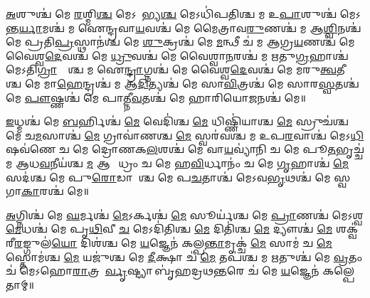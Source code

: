 
\ul{𑌅}\ul{}𑌶𑍁𑌶𑍍𑌚॑ 𑌮𑍇 \ul{𑌰}𑌶𑍍𑌮𑌿\ul{𑌶𑍍𑌚} 𑌮𑍇𑌽𑌦𑌾᳚𑌭𑍍𑌯\ul{𑌶𑍍𑌚} 𑌮𑍇𑌽𑌧𑌿॑𑌪𑌤𑌿𑌶𑍍𑌚 𑌮 𑌉\ul{𑌪𑌾}\ul{}𑌶𑍁𑌶𑍍𑌚॑ 𑌮𑍇𑌽𑌨𑍍𑌤\ul{𑌰𑍍𑌯𑌾}𑌮𑌶𑍍𑌚॑ 𑌮 𑌐𑌨𑍍𑌦𑍍𑌰𑌵𑌾\ul{𑌯}𑌵𑌶𑍍𑌚॑ 𑌮𑍇 𑌮𑍈𑌤𑍍𑌰𑌾𑌵\ul{𑌰𑍁}𑌣𑌶𑍍𑌚॑ 𑌮 𑌆\ul{𑌶𑍍𑌵𑌿}𑌨𑌶𑍍𑌚॑ 𑌮𑍇 𑌪𑍍𑌰𑌤𑌿\ul{𑌪𑍍𑌰}𑌸𑍍𑌥𑌾𑌨॑𑌶𑍍𑌚 𑌮𑍇 \ul{𑌶𑍁}𑌕𑍍𑌰𑌶𑍍𑌚॑ 𑌮𑍇 \ul{𑌮}𑌨𑍍𑌥𑍀 𑌚॑ 𑌮 𑌆𑌗𑍍𑌰\ul{𑌯}𑌣𑌶𑍍𑌚॑ 𑌮𑍇 𑌵𑍈𑌶𑍍𑌵\ul{𑌦𑍇}𑌵𑌶𑍍𑌚॑ 𑌮𑍇 \ul{𑌧𑍍𑌰𑍁}𑌵𑌶𑍍𑌚॑ 𑌮𑍇 𑌵𑍈𑌶𑍍𑌵𑌾\ul{𑌨}𑌰𑌶𑍍𑌚॑ 𑌮 𑌋𑌤𑍁\ul{𑌗𑍍𑌰}𑌹𑌾𑌶𑍍𑌚॑ 𑌮𑍇𑌽𑌤𑌿\ul{𑌗𑍍𑌰𑌾}𑌹𑍍𑌯𑌾᳚𑌶𑍍𑌚 𑌮 𑌐\ul{𑌨𑍍𑌦𑍍𑌰𑌾}𑌗𑍍𑌨𑌶𑍍𑌚॑ 𑌮𑍇 𑌵𑍈𑌶𑍍𑌵\ul{𑌦𑍇}𑌵𑌶𑍍𑌚॑ 𑌮𑍇 𑌮𑌰𑍁\ul{𑌤𑍍𑌵}𑌤𑍀𑌯𑌾᳚𑌶𑍍𑌚 𑌮𑍇 𑌮𑌾\ul{𑌹𑍇}𑌨𑍍𑌦𑍍𑌰𑌶𑍍𑌚॑ 𑌮 𑌆\ul{𑌦𑌿}𑌤𑍍𑌯𑌶𑍍𑌚॑ 𑌮𑍇 𑌸𑌾\ul{𑌵𑌿}𑌤𑍍𑌰𑌶𑍍𑌚॑ 𑌮𑍇 𑌸𑌾𑌰\ul{𑌸𑍍𑌵}𑌤𑌶𑍍𑌚॑ 𑌮𑍇 \ul{𑌪𑍗}𑌷𑍍𑌣𑌶𑍍𑌚॑ 𑌮𑍇 𑌪𑌾𑌤𑍍𑌨𑍀\ul{𑌵}𑌤𑌶𑍍𑌚॑ 𑌮𑍇 𑌹𑌾𑌰𑌿𑌯𑍋\ul{𑌜}𑌨𑌶𑍍𑌚॑ 𑌮𑍇॥ 


\ul{𑌇}𑌧𑍍𑌮𑌶𑍍𑌚॑ 𑌮𑍇 \ul{𑌬}𑌰𑍍𑌹𑌿𑌶𑍍𑌚॑ \ul{𑌮𑍇} 𑌵𑍇𑌦𑌿॑𑌶𑍍𑌚 \ul{𑌮𑍇} 𑌧𑌿𑌷𑍍𑌣𑌿॑𑌯𑌾𑌶𑍍𑌚 \ul{𑌮𑍇} 𑌸𑍍𑌰𑍁𑌚॑𑌶𑍍𑌚 𑌮𑍇 𑌚\ul{𑌮}𑌸𑌾𑌶𑍍𑌚॑ \ul{𑌮𑍇} 𑌗𑍍𑌰𑌾𑌵𑌾॑𑌣𑌶𑍍𑌚 \ul{𑌮𑍇} 𑌸𑍍𑌵𑌰॑𑌵𑌶𑍍𑌚 𑌮 𑌉𑌪\ul{𑌰}𑌵𑌾𑌶𑍍𑌚॑ 𑌮𑍇𑌽\ul{𑌧𑌿}𑌷𑌵॑𑌣𑍇 𑌚 𑌮𑍇 𑌦𑍍𑌰𑍋𑌣𑌕\ul{𑌲}𑌶𑌶𑍍𑌚॑ 𑌮𑍇 𑌵𑌾\ul{𑌯}𑌵𑍍𑌯𑌾॑𑌨𑌿 𑌚 𑌮𑍇 𑌪𑍂\ul{𑌤}𑌭𑍃𑌚𑍍𑌚॑ 𑌮 𑌆𑌧\ul{𑌵}𑌨𑍀𑌯॑𑌶𑍍𑌚 \ul{𑌮} 𑌆𑌗𑍍𑌨𑍀᳚𑌧𑍍𑌰𑌂 𑌚 𑌮𑍇 𑌹\ul{𑌵𑌿}𑌰𑍍𑌧𑌾𑌨𑌂॑ 𑌚 𑌮𑍇 \ul{𑌗𑍃}𑌹𑌾𑌶𑍍𑌚॑ \ul{𑌮𑍇} 𑌸𑌦॑𑌶𑍍𑌚 𑌮𑍇 𑌪𑍁\ul{𑌰𑍋}𑌡𑌾𑌶𑌾᳚𑌶𑍍𑌚 𑌮𑍇 𑌪\ul{𑌚}𑌤𑌾𑌶𑍍𑌚॑ 𑌮𑍇𑌽𑌵\ul{𑌭𑍃}𑌥𑌶𑍍𑌚॑ 𑌮𑍇 𑌸𑍍𑌵𑌗𑌾\ul{𑌕𑌾}𑌰𑌶𑍍𑌚॑ 𑌮𑍇॥ 


\ul{𑌅}𑌗𑍍𑌨𑌿𑌶𑍍𑌚॑ 𑌮𑍇 \ul{𑌘}𑌰𑍍𑌮𑌶𑍍𑌚॑ \ul{𑌮𑍇}𑌽𑌰𑍍𑌕𑌶𑍍𑌚॑ \ul{𑌮𑍇} 𑌸𑍂𑌰𑍍𑌯॑𑌶𑍍𑌚 𑌮𑍇 \ul{𑌪𑍍𑌰𑌾}𑌣𑌶𑍍𑌚॑ 𑌮𑍇𑌽𑌶𑍍𑌵\ul{𑌮𑍇}𑌧𑌶𑍍𑌚॑ 𑌮𑍇 𑌪𑍃\ul{𑌥𑌿}𑌵𑍀 \ul{𑌚} 𑌮𑍇𑌽𑌦𑌿॑𑌤𑌿𑌶𑍍𑌚 \ul{𑌮𑍇} 𑌦𑌿𑌤𑌿॑𑌶𑍍𑌚 \ul{𑌮𑍇} 𑌦𑍍𑌯𑍗𑌶𑍍𑌚॑ \ul{𑌮𑍇} 𑌶𑌕𑍍𑌵॑𑌰𑍀\ul{𑌰}𑌙𑍍𑌗𑍁𑌲॑\ul{𑌯𑍋} 𑌦𑌿𑌶॑𑌶𑍍𑌚 𑌮𑍇 \ul{𑌯}𑌜𑍍𑌞𑍇𑌨॑ 𑌕𑌲𑍍𑌪\ul{𑌨𑍍𑌤𑌾}𑌮𑍃𑌕𑍍𑌚॑ \ul{𑌮𑍇} 𑌸𑌾𑌮॑ 𑌚 \ul{𑌮𑍇} 𑌸𑍍𑌤𑍋𑌮॑𑌶𑍍𑌚 \ul{𑌮𑍇} 𑌯𑌜𑍁॑𑌶𑍍𑌚 𑌮𑍇 \ul{𑌦𑍀}𑌕𑍍𑌷𑌾 𑌚॑ \ul{𑌮𑍇} 𑌤𑌪॑𑌶𑍍𑌚 𑌮 \ul{𑌋}𑌤𑍁𑌶𑍍𑌚॑ 𑌮𑍇 \ul{𑌵𑍍𑌰}𑌤𑌂 𑌚॑ 𑌮𑍇𑌽𑌹𑍋\ul{𑌰𑌾}𑌤𑍍𑌰𑌯𑍋᳚\ul{𑌰𑍍𑌵𑍃}𑌷𑍍𑌟𑍍𑌯𑌾 𑌬𑍃॑𑌹𑌦𑍍𑌰𑌥\ul{𑌨𑍍𑌤}𑌰𑍇 𑌚॑ 𑌮𑍇 \ul{𑌯}𑌜𑍍𑌞𑍇𑌨॑ 𑌕𑌲𑍍𑌪𑍇𑌤𑌾𑌮𑍍॥ 


